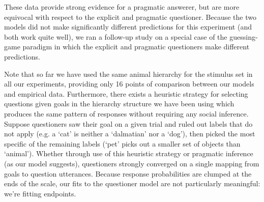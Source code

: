 \documentclass[12pt, floatsintext, jou]{apa6}
\begin{document}
These data provide strong evidence for a pragmatic answerer, but are more equivocal with respect to the explicit and pragmatic questioner. Because the two models did not make significantly different predictions for this experiment (and both work quite well), we ran a follow-up study on a special case of the guessing-game paradigm in which the explicit and pragmatic questioners make different predictions.

Note that so far we have used the same animal hierarchy for the stimulus set in all our experiments, providing only 16 points of comparison between our models and empirical data. Furthermore, there exists a heuristic strategy for selecting questions given goals in the hierarchy structure we have been using which produces the same pattern of responses without requiring any social inference. Suppose questioners saw their goal on a given trial and ruled out labels that do not apply (e.g. a `cat' is neither a `dalmatian' nor a `dog'), then picked the most specific of the remaining labels (`pet' picks out a smaller set of objects than `animal'). Whether through use of this heuristic strategy or pragmatic inference (as our model suggests), questioners strongly converged on a single mapping from goals to question utterances. Because response probabilities are clumped at the ends of the scale, our fits to the questioner model are not particularly meaningful: we're fitting endpoints.
 
\end{document}
